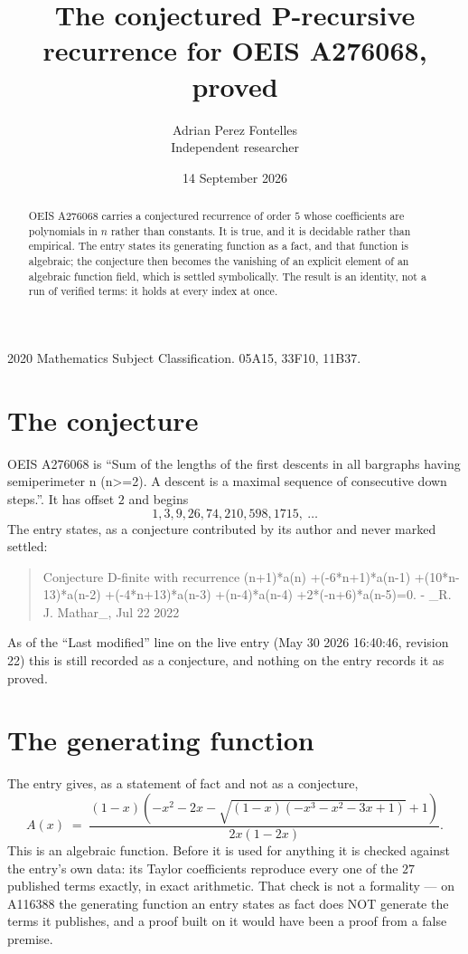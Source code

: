 \documentclass[11pt,a4paper]{article}
\title{The conjectured P-recursive recurrence for OEIS A276068, proved}
\author{Adrian Perez Fontelles\\ \small Independent researcher}
\date{14 September 2026}
\theoremstyle{plain}
\theoremstyle{definition}
\begin{document}
\maketitle

\begin{abstract}
OEIS A276068 carries a conjectured recurrence of order $5$ whose coefficients are polynomials in
$n$ rather than constants. It is true, and it is decidable rather than empirical. The entry
states its generating function as a fact, and that function is algebraic; the conjecture then
becomes the vanishing of an explicit element of an algebraic function field, which is settled
symbolically. The result is an identity, not a run of verified terms: it holds at every index
at once.
\end{abstract}

\noindent\small 2020 Mathematics Subject Classification. 05A15, 33F10, 11B37.\normalsize

\section{The conjecture}

OEIS A276068 is ``Sum of the lengths of the first descents in all bargraphs having semiperimeter n (n>=2). A descent is a maximal sequence of consecutive down steps.''. It has offset $2$ and begins
\[
1, 3, 9, 26, 74, 210, 598, 1715,\ \dots
\]
The entry states, as a conjecture contributed by its author and never marked settled:
\begin{quote}\raggedright\small
Conjecture D-finite with recurrence (n+1)*a(n) +(-6*n+1)*a(n-1) +(10*n-13)*a(n-2) +(-4*n+13)*a(n-3) +(n-4)*a(n-4) +2*(-n+6)*a(n-5)=0. - \_R. J. Mathar\_, Jul 22 2022
\end{quote}
As of the ``Last modified'' line on the live entry (May 30 2026 16:40:46, revision 22)
this is still recorded as a conjecture, and nothing on the entry records it as proved.

\section{The generating function}

The entry gives, as a statement of fact and not as a conjecture,
\[
A(x)\;=\;\frac{\left(1 - x\right) \left(- x^{2} - 2 x - \sqrt{\left(1 - x\right) \left(- x^{3} - x^{2} - 3 x + 1\right)} + 1\right)}{2 x \left(1 - 2 x\right)} .
\]
This is an algebraic function. Before it is used for anything it is checked against the entry's
own data: its Taylor coefficients reproduce every one of the $27$ published terms
exactly, in exact arithmetic. That check is not a formality --- on A116388 the generating
function an entry states as fact does NOT generate the terms it publishes, and a proof built on
it would have been a proof from a false premise.
\end{document}
